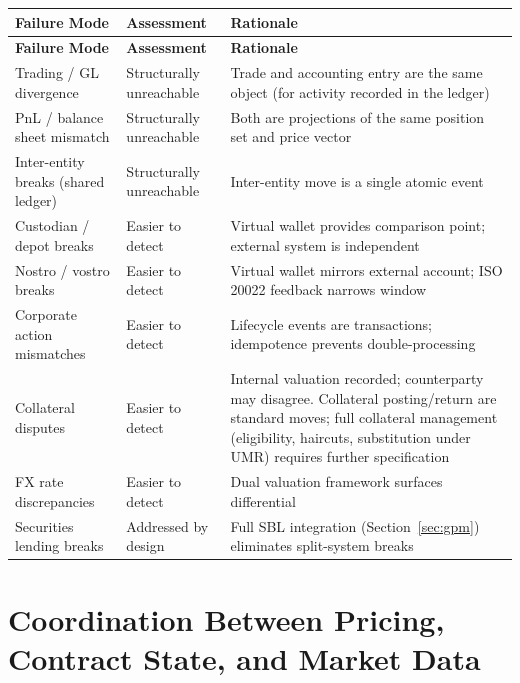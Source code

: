 \documentclass[11pt,a4paper]{article}
\begin{document}
\begin{center}
\begin{longtable}{p{4.5cm} p{3cm} p{5.5cm}}
\toprule
\textbf{Failure Mode} & \textbf{Assessment} & \textbf{Rationale} \\
\midrule
\endfirsthead
\toprule
\textbf{Failure Mode} & \textbf{Assessment} & \textbf{Rationale} \\
\midrule
\endhead
Trading / GL divergence & Structurally unreachable & Trade and accounting entry are the same object (for activity recorded in the ledger) \\
\midrule
PnL / balance sheet mismatch & Structurally unreachable & Both are projections of the same position set and price vector \\
\midrule
Inter-entity breaks (shared ledger) & Structurally unreachable & Inter-entity move is a single atomic event \\
\midrule
Custodian / depot breaks & Easier to detect & Virtual wallet provides comparison point; external system is independent \\
\midrule
Nostro / vostro breaks & Easier to detect & Virtual wallet mirrors external account; ISO 20022 feedback narrows window \\
\midrule
Corporate action mismatches & Easier to detect & Lifecycle events are transactions; idempotence prevents double-processing \\
\midrule
Collateral disputes & Easier to detect & Internal valuation recorded; counterparty may disagree. Collateral posting/return are standard moves; full collateral management (eligibility, haircuts, substitution under UMR) requires further specification \\
\midrule
FX rate discrepancies & Easier to detect & Dual valuation framework surfaces differential \\
\midrule
Securities lending breaks & Addressed by design & Full SBL integration (Section~\ref{sec:gpm}) eliminates split-system breaks \\
\bottomrule
\end{longtable}
\end{center}

\section{Coordination Between Pricing, Contract State, and Market Data}
\label{app:pricing-coordination}
\end{document}
